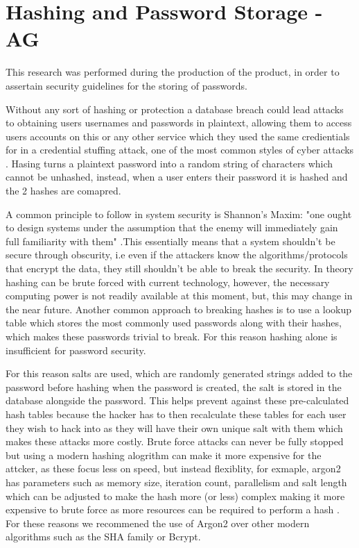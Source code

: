 \documentclass[11pt]{report}
\begin{document}
\section{Hashing and Password Storage - AG}

This research was performed during the production of the product, in order to assertain security guidelines for the storing of passwords.\newline

Without any sort of hashing or protection a database breach could lead attacks to obtaining users usernames and passwords in plaintext, allowing them to access users accounts on this or any other service which they used the same credientials for in a credential stuffing attack, one of the most common styles of cyber attacks \cite{OWASP2020}. Hasing turns a plaintext password into a random string of characters which cannot be unhashed, instead, when a user enters their password it is hashed and the 2 hashes are comapred.

A common principle to follow in system security is Shannon's Maxim: "one ought to design systems under the assumption that the enemy will immediately gain full familiarity with them" \cite{Shannon1949}.This essentially means that a system shouldn’t be secure through obscurity, i.e even if the attackers know the algorithms/protocols that encrypt the data, they still shouldn’t be able to break the security. In theory hashing can be brute forced with current technology, however, the necessary computing power is not readily available at this moment, but, this may change in the near future. Another common approach to breaking hashes is to use a lookup table which stores the most commonly used passwords along with their hashes, which makes these passwords trivial to break. For this reason hashing alone is insufficient for password security. \cite{Tsudik1992}

For this reason salts are used, which are randomly generated strings added to the password before hashing when the password is created, the salt is stored in the database alongside the password. This helps prevent against these pre-calculated hash tables because the hacker has to then recalculate these tables for each user they wish to hack into as they will have their own unique salt with them which makes these attacks more costly. Brute force attacks can never be fully stopped but using a modern hashing alogrithm can make it more expensive for the attcker, as these focus less on speed, but instead flexiblity, for exmaple, argon2 has parameters such as memory size, iteration count, parallelism and salt length which can be adjusted to make the hash more (or less) complex making it more expensive to brute force as more resources can be required to perform a hash \cite{Biryukov2016}. For these reasons we recommened the use of Argon2 over other modern algorithms such as the SHA family or Bcrypt.
\end{document}
